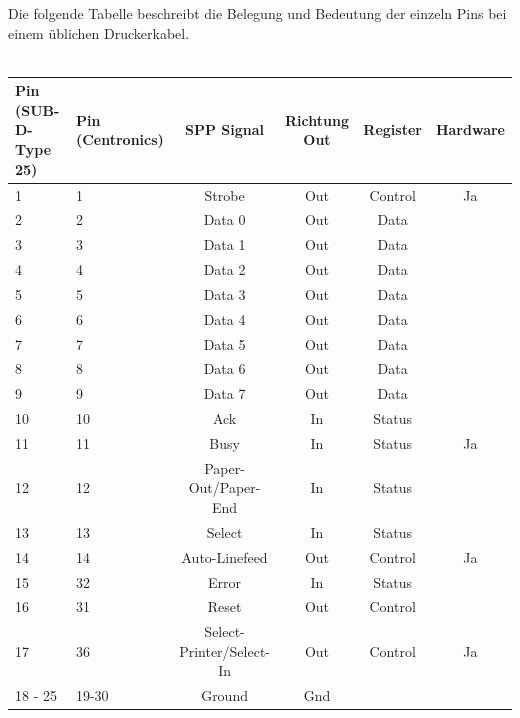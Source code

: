 \documentclass[a4paper,11pt]{article}
\begin{document}
\noindent
Die folgende Tabelle beschreibt die  Belegung und Bedeutung der einzeln Pins bei einem üblichen Druckerkabel. 
 \\ \\
 \begin{tabular}{|p{20mm}|p{20mm}|c|c|c|c|}
  \hline
	Pin (SUB-D-Type 25) & Pin (Centronics) & SPP Signal & Richtung Out & Register & Hardware\\ \hline
	1 & 	1	& 	Strobe				& 	Out		&	Control		&	Ja	\\ \hline
	2 & 	2	&	Data 0				&	Out		& 	Data		&     \\ \hline
	3 &	3	&	Data 1				&	Out		&	Data		&     \\ \hline
	4 &	4	&	Data 2				&	Out		&	Data		&     \\ \hline
	5 &	5	&	Data 3				&	Out		&	Data		&     \\ \hline
	6 &	6	&	Data 4				&	Out		&	Data		&     \\ \hline
	7 &	7	&	Data 5				&	Out		&	Data		&     \\ \hline
	8 &	8	&	Data 6				&	Out		&	Data		&     \\ \hline
	9 &	9	&	Data 7				&	Out		&	Data		&     \\ \hline
	10 & 	10	&	Ack				&	In		&	Status		&	    \\ \hline
	11 & 	11	&	Busy				&	In		&	Status		&	Ja  \\ \hline
	12 & 	12	&	Paper-Out/Paper-End		&	In		&	Status		&	    \\ \hline
	13 & 	13	&	Select				&	In		&	Status		&	    \\ \hline
	14 & 	14	&	Auto-Linefeed			&	Out		&	Control		&	Ja  \\ \hline
	15 & 	32	&	Error				&	In		&	Status		&	    \\ \hline
	16 & 	31	&	Reset				&	Out		&	Control		&	    \\ \hline
	17 & 	36	&	Select-Printer/Select-In	&	Out		&	Control		&	Ja  \\ \hline
	18 - 25	&	19-30	&	Ground	&	Gnd	&	&             \\ \hline
 \end{tabular}
\end{document}
